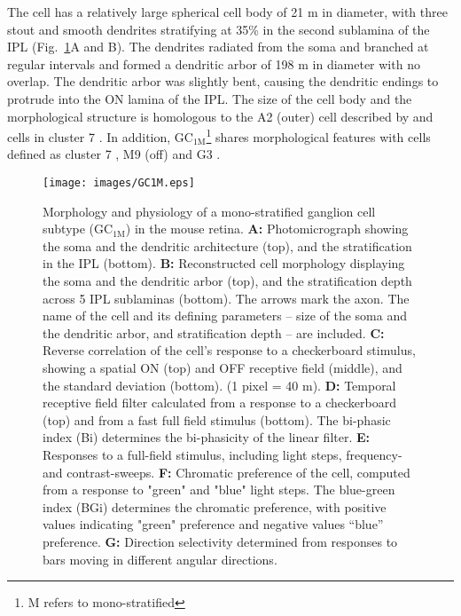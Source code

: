The cell has a relatively large spherical cell body of 21 \textmu m in diameter, with three stout and smooth dendrites stratifying at 35\% in the second sublamina of the IPL (Fig.~\ref{figure1}A and B). The dendrites radiated from the soma and branched at regular intervals and formed a dendritic arbor of 198 \textmu m in diameter with no overlap. The dendritic arbor was slightly bent, causing the dendritic endings to protrude into the ON lamina of the IPL. The size of the cell body and the morphological structure is homologous to the A2 (outer) cell described by \citep{sun02} and cells in cluster 7 \citep{kong05}. In addition, GC$_{\text{1M}}$\footnote{M refers to mono-stratified} shares morphological features with cells defined as cluster 7 \citep{badea04}, M9 (off) \citep{coombs06} and G3 \citep{voelgyi09}. 

\begin{figure}[!t]
\begin{center}
\texttt{[image: images/GC1M.eps]}
\caption{Morphology and physiology of a mono-stratified ganglion cell subtype (GC$_\text{{1M}}$) in the mouse retina. \textbf{A:} Photomicrograph showing the soma and the dendritic architecture (top), and the stratification in the IPL (bottom). \textbf{B:} Reconstructed cell morphology displaying the soma and the dendritic arbor (top), and the stratification depth across 5 IPL sublaminas (bottom). The arrows mark the axon. The name of the cell and its defining parameters – size of the soma and the dendritic arbor, and stratification depth – are included. \textbf{C:}  Reverse correlation of the cell’s response to a checkerboard stimulus, showing a spatial ON (top) and OFF receptive field (middle), and the standard deviation (bottom). (1 pixel = 40 \textmu m). \textbf{D:} Temporal receptive field filter calculated from a response to a checkerboard (top) and from a fast full field stimulus (bottom). The bi-phasic index (Bi) determines the bi-phasicity of the linear filter. \textbf{E:} Responses to a full-field stimulus, including light steps, frequency- and contrast-sweeps. \textbf{F:} Chromatic preference of the cell, computed from a response to "green" and "blue" light steps. The blue-green index (BGi) determines the chromatic preference, with positive values indicating "green" preference and negative values “blue” preference. \textbf{G:} Direction selectivity determined from responses to bars moving in different angular directions.}
\label{figure1}
\end{center}
\end{figure}

